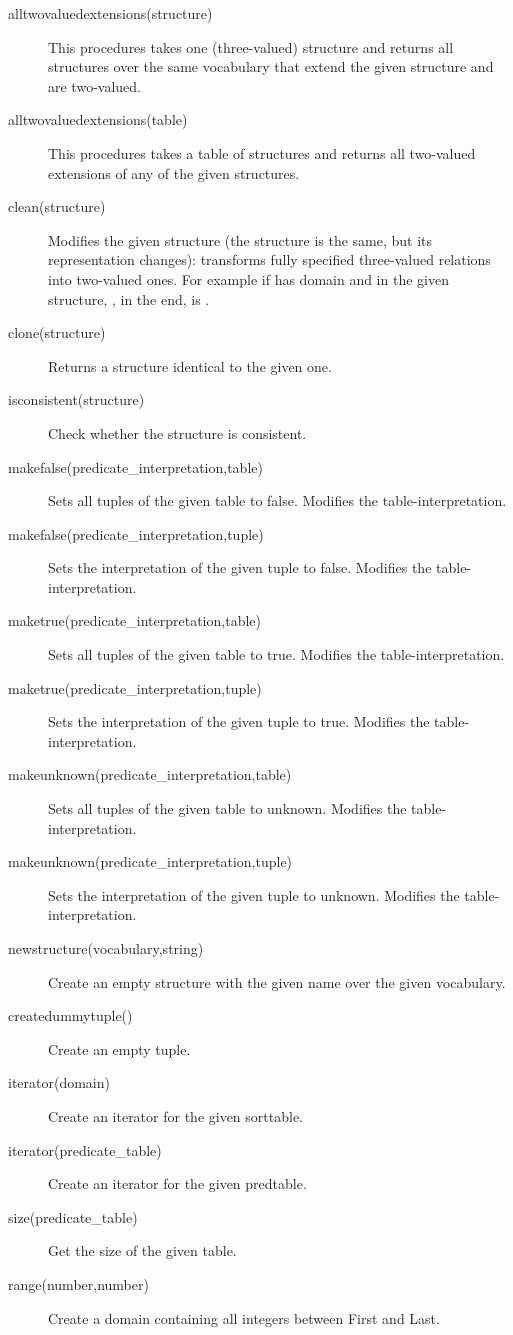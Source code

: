 \begin{description}
	\item[alltwovaluedextensions(structure)] This procedures takes one (three-valued) structure and returns all structures over the same vocabulary that extend the given structure and are two-valued.
	\item[alltwovaluedextensions(table)]
		This procedures takes a table of structures and returns all two-valued extensions of any of the given structures.
	\item[clean(structure)]
		Modifies the given structure (the structure is the same, but its representation changes): transforms fully specified three-valued relations into two-valued ones.  For example if  has domain \code[1..2] and in the given structure, , in the end,  is .
	\item[clone(structure)]
		Returns a structure identical to the given one.
	\item[isconsistent(structure)]
 		Check whether the structure is consistent.
	\item[makefalse(predicate\_interpretation,table)]
 		Sets all tuples of the given table to false.
 		Modifies the table-interpretation.
	\item[makefalse(predicate\_interpretation,tuple)]
 		Sets the interpretation of the given tuple to false.
 		Modifies the table-interpretation.
	\item[maketrue(predicate\_interpretation,table)]
 		Sets all tuples of the given table to true.
 		Modifies the table-interpretation.
	\item[maketrue(predicate\_interpretation,tuple)]
 		Sets the interpretation of the given tuple to true.
 		Modifies the table-interpretation.
	\item[makeunknown(predicate\_interpretation,table)]
 		Sets all tuples of the given table to unknown.
 		Modifies the table-interpretation.
	\item[makeunknown(predicate\_interpretation,tuple)]
 		Sets the interpretation of the given tuple to unknown.
 		Modifies the table-interpretation.
	\item[newstructure(vocabulary,string)]
 		Create an empty structure with the given name over the given vocabulary.
 		
 	\item[createdummytuple()]
		Create an empty tuple.
	
	\item[iterator(domain)]
 		Create an iterator for the given sorttable.
	\item[iterator(predicate\_table)]
 		Create an iterator for the given predtable.
	\item[size(predicate\_table)]
 		Get the size of the given table.
 		
 	\item[range(number,number)]
 		Create a domain containing all integers between First and Last.
\end{description}


